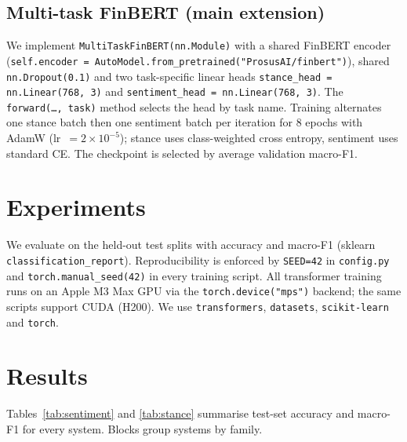 \documentclass[conference, 10pt, twocolumn]{IEEEtran}
\begin{document}
\subsection{Multi-task FinBERT (main extension)}
\label{sec:method-mt}
We implement \texttt{MultiTaskFinBERT(nn.Module)} with a
shared FinBERT encoder
(\texttt{self.encoder = AutoModel.\allowbreak from\_pretrained(}\allowbreak\texttt{"ProsusAI/finbert")}),
shared \texttt{nn.Dropout(0.1)} and two task-specific linear heads
\texttt{stance\_head = nn.Linear(768, 3)} and
\texttt{sentiment\_head = nn.Linear(768, 3)}. The \texttt{forward(\dots,
task)} method selects the head by task name. Training alternates one
stance batch then one sentiment batch per iteration for 8 epochs with
AdamW (lr~$=2\times10^{-5}$); stance uses class-weighted cross entropy,
sentiment uses standard CE. The checkpoint is selected by average
validation macro-F1.

\section{Experiments}
\label{sec:exp}
We evaluate on the held-out test splits with accuracy and macro-F1
(sklearn \texttt{classification\_report}). Reproducibility is enforced by
\texttt{SEED=42} in \texttt{config.py} and \texttt{torch.manual\_seed(42)}
in every training script. All transformer training runs on an Apple M3 Max
GPU via the \texttt{torch.device("mps")} backend; the same scripts support
CUDA (H200). We use \texttt{transformers}, \texttt{datasets},
\texttt{scikit-learn} and \texttt{torch}.

\section{Results}
\label{sec:results}

Tables~\ref{tab:sentiment} and \ref{tab:stance} summarise test-set
accuracy and macro-F1 for every system. Blocks group systems by family.
\end{document}
